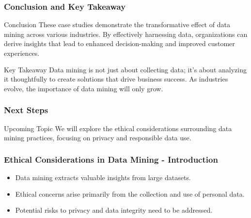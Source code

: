 \documentclass[aspectratio=169]{beamer}
\begin{document}
\begin{frame}[fragile]
    \frametitle{Conclusion and Key Takeaway}
    \begin{block}{Conclusion}
        These case studies demonstrate the transformative effect of data mining across various industries. By effectively harnessing data, organizations can derive insights that lead to enhanced decision-making and improved customer experiences.
    \end{block}
    
    \begin{block}{Key Takeaway}
        Data mining is not just about collecting data; it’s about analyzing it thoughtfully to create solutions that drive business success. As industries evolve, the importance of data mining will only grow.
    \end{block}
\end{frame}

\begin{frame}[fragile]
    \frametitle{Next Steps}
    \begin{block}{Upcoming Topic}
        We will explore the ethical considerations surrounding data mining practices, focusing on privacy and responsible data use.
    \end{block}
\end{frame}

\begin{frame}[fragile]
    \frametitle{Ethical Considerations in Data Mining - Introduction}
    \begin{itemize}
        \item Data mining extracts valuable insights from large datasets.
        \item Ethical concerns arise primarily from the collection and use of personal data.
        \item Potential risks to privacy and data integrity need to be addressed.
    \end{itemize}
\end{frame}
\end{document}
